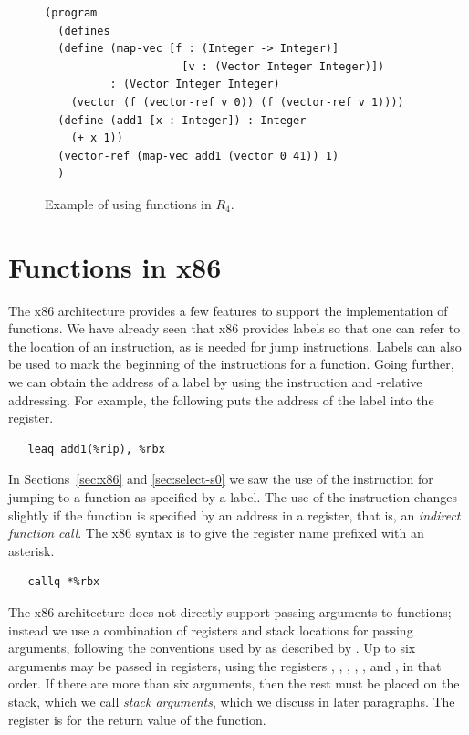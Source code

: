 \documentclass[11pt]{book}
\begin{document}
\begin{figure}[tbp]
\begin{lstlisting}
(program
  (defines
  (define (map-vec [f : (Integer -> Integer)]
                     [v : (Vector Integer Integer)])
          : (Vector Integer Integer)
    (vector (f (vector-ref v 0)) (f (vector-ref v 1))))
  (define (add1 [x : Integer]) : Integer
    (+ x 1))
  (vector-ref (map-vec add1 (vector 0 41)) 1)
  )
\end{lstlisting}
\caption{Example of using functions in $R_4$.}
\label{fig:r4-function-example}
\end{figure}



\section{Functions in x86}
\label{sec:fun-x86}

The x86 architecture provides a few features to support the
implementation of functions. We have already seen that x86 provides
labels so that one can refer to the location of an instruction, as is
needed for jump instructions. Labels can also be used to mark the
beginning of the instructions for a function.  Going further, we can
obtain the address of a label by using the  instruction and
-relative addressing. For example, the following puts the
address of the  label into the  register.
\begin{lstlisting}
   leaq add1(%rip), %rbx
\end{lstlisting}

In Sections~\ref{sec:x86} and \ref{sec:select-s0} we saw the use of
the  instruction for jumping to a function as specified by
a label. The use of the instruction changes slightly if the function
is specified by an address in a register, that is, an \emph{indirect
  function call}. The x86 syntax is to give the register name prefixed
with an asterisk.
\begin{lstlisting}
   callq *%rbx
\end{lstlisting}

The x86 architecture does not directly support passing arguments to
functions; instead we use a combination of registers and stack
locations for passing arguments, following the conventions used by
 as described by \cite{Matz:2013aa}. Up to six arguments may
be passed in registers, using the registers , ,
, , , and , in that order.  If
there are more than six arguments, then the rest must be placed on the
stack, which we call \emph{stack arguments}, which we discuss in later
paragraphs. The register  is for the return value of the
function.
\end{document}
